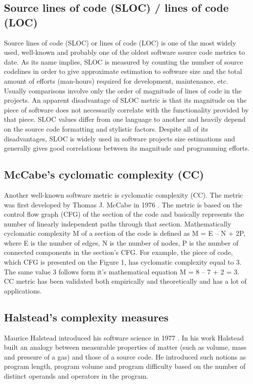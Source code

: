 \subsection{Source lines of code (SLOC) / lines of code (LOC)}
\label{background-source-lines-of-code}
\qquad Source lines of code (SLOC) or lines of code (LOC) is one of the most widely used, well-known and probably one of the oldest software source code metrics to date. As its name implies, SLOC is measured by counting the number of source codelines in order to give approximate estimation to software size and the total amount of efforts (man-hours) required for development, maintenance, etc. Usually comparisons involve only the order of magnitude of lines of code in the projects. An apparent disadvantage of SLOC metric is that its magnitude on the piece of software does not necessarily correlate with the functionality provided by that piece. SLOC values differ from one language to another and heavily depend on the source code formatting and stylistic factors. Despite all of its disadvantages, SLOC is widely used in software projects size estimations and generally gives good correlations between its magnitude and programming efforts.

\subsection{McCabe's cyclomatic complexity (CC)}
\label{background-cyclomatic-complexity}
\qquad Another well-known software metric is cyclomatic complexity (CC). The metric was first developed by Thomas J. McCabe in 1976 \cite{cyclomatic-complexity-paper}. The metric is based on the control flow graph (CFG) of the section of the code and basically represents the number of linearly independent paths through that section. Mathematically cyclomatic complexity M of a section of the code is defined as M = E – N + 2P, where E is the number of edges, N is the number of nodes, P is the number of connected components in the section's CFG. For example, the piece of code, which CFG is presented on the Figure 1, has cyclomatic complexity equal to 3. The same value 3 follows form it's mathematical equation M = 8 – 7 + 2 = 3. CC metric has been validated both empirically and theoretically and has a lot of applications.

\subsection{Halstead's complexity measures}
\label{background-halsteads-measures}
\qquad Maurice Halstead introduced his software science in 1977 \cite{halstead-book}. In his work Halstead built an analogy between measurable properties of matter (such as volume, mass and pressure of a gas) and those of a source code. He introduced such notions as program length, program volume and program difficulty based on the number of distinct operands and operators in the program.

